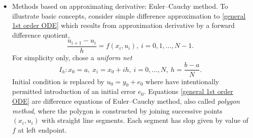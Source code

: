 \documentclass{article}
\begin{document}
\begin{enumerate}
\begin{itemize}
\begin{itemize}
			\item {\sf Methods based on approximating derivative: Euler--Cauchy method.} To illustrate basic concepts, consider simple difference approximation to \eqref{general 1st order ODE} which results from approximation derivative by a forward difference quotient,
			\begin{equation}
				\label{general 1st order ODE: forward difference}
				\frac{u_{i+1} - u_i}{h} = f(x_i,u_i),\ i = 0,1,\ldots,N - 1.
			\end{equation}
			For simplicity only, chose a {\it uniform net}
			\begin{equation}
				\label{uniform net}
				I_h:x_0 = a,\ x_i = x_0 + ih,\ i = 0,\ldots,N,\ h = \frac{b - a}{N}.
			\end{equation}
			Initial condition is replaced by $u_0 = y_0 + e_0$ where have intentionally permitted introduction of an initial error $e_0$. Equations \eqref{general 1st order ODE} are difference equations of Euler--Cauchy method, also called {\it polygon method}, where the polygon is constructed by joining successive points $(x_i,u_i)$ with straight line segments. Each segment has slop given by value of $f$ at left endpoint.
			

\end{itemize}
\end{itemize}
\end{enumerate}
\end{document}
